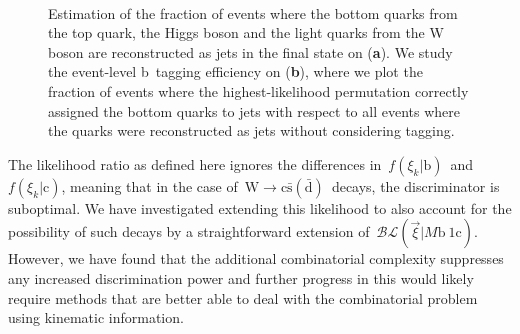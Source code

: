 \begin{figure}
\begin{centering}
\\
\caption[Fraction of events with correct matching to the hard process]{Estimation of the fraction of events where the bottom quarks from the top quark, the Higgs boson and the light quarks from the W boson are reconstructed as jets in the final state on (\textbf{a}). We study the event-level b~tagging efficiency on (\textbf{b}), where we plot the fraction of events where the highest-likelihood permutation correctly assigned the bottom quarks to jets with respect to all events where the quarks were reconstructed as jets without considering tagging.}
\label{fig:blr_matching}
\end{centering}
\end{figure}
 
The likelihood ratio as defined here ignores the differences in~$f(\xi_k | \mathrm{b})$~and~$f(\xi_k | \mathrm{c})$, meaning that in the case of~$\mathrm{W} \rightarrow \mathrm{c}\bar{\mathrm{s}} (\bar{\mathrm{d}})$~decays, the discriminator is suboptimal. We have investigated extending this likelihood to also account for the possibility of such decays by a straightforward extension of~$\mathcal{BL}(\vec{\xi} | M\mathrm{b}~1\mathrm{c})$. However, we have found that the additional combinatorial complexity suppresses any increased discrimination power and further progress in this would likely require methods that are better able to deal with the combinatorial problem using kinematic information.

